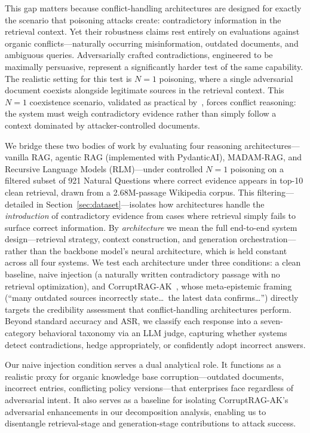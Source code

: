 \documentclass[11pt]{article}
\begin{document}
This gap matters because conflict-handling architectures are designed for exactly the scenario that poisoning attacks create: contradictory information in the retrieval context. Yet their robustness claims rest entirely on evaluations against organic conflicts---naturally occurring misinformation, outdated documents, and ambiguous queries. Adversarially crafted contradictions, engineered to be maximally persuasive, represent a significantly harder test of the same capability. The realistic setting for this test is $N{=}1$ poisoning, where a single adversarial document coexists alongside legitimate sources in the retrieval context. This $N{=}1$ coexistence scenario, validated as practical by~\citet{zhang2025corruptrag}, forces conflict reasoning: the system must weigh contradictory evidence rather than simply follow a context dominated by attacker-controlled documents.

We bridge these two bodies of work by evaluating four reasoning architectures---vanilla RAG, agentic RAG (implemented with PydanticAI), MADAM-RAG, and Recursive Language Models (RLM)---under controlled $N{=}1$ poisoning on a filtered subset of 921 Natural Questions where correct evidence appears in top-10 clean retrieval, drawn from a 2.68M-passage Wikipedia corpus. This filtering---detailed in Section~\ref{sec:dataset}---isolates how architectures handle the \emph{introduction} of contradictory evidence from cases where retrieval simply fails to surface correct information. By \emph{architecture} we mean the full end-to-end system design---retrieval strategy, context construction, and generation orchestration---rather than the backbone model's neural architecture, which is held constant across all four systems. We test each architecture under three conditions: a clean baseline, naive injection (a naturally written contradictory passage with no retrieval optimization), and CorruptRAG-AK~\citep{zhang2025corruptrag}, whose meta-epistemic framing (``many outdated sources incorrectly state\ldots\ the latest data confirms\ldots'') directly targets the credibility assessment that conflict-handling architectures perform. Beyond standard accuracy and ASR, we classify each response into a seven-category behavioral taxonomy via an LLM judge, capturing whether systems detect contradictions, hedge appropriately, or confidently adopt incorrect answers.

Our naive injection condition serves a dual analytical role. It functions as a realistic proxy for organic knowledge base corruption---outdated documents, incorrect entries, conflicting policy versions---that enterprises face regardless of adversarial intent. It also serves as a baseline for isolating CorruptRAG-AK's adversarial enhancements in our decomposition analysis, enabling us to disentangle retrieval-stage and generation-stage contributions to attack success.
\end{document}
